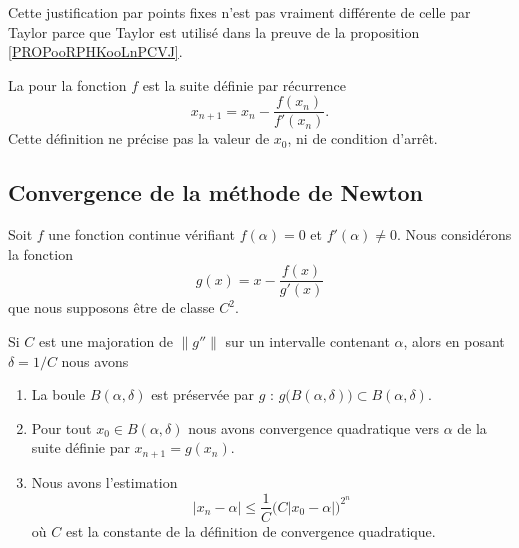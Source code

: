 \begin{remark}
    Cette justification par points fixes n'est pas vraiment différente de celle par Taylor parce que Taylor est utilisé dans la preuve de la proposition \ref{PROPooRPHKooLnPCVJ}.
\end{remark}

\begin{definition}
    La  pour la fonction \( f\) est la suite définie par récurrence
    \begin{equation}
        x_{n+1}=x_n-\frac{ f(x_n)  }{ f'(x_n) }.
    \end{equation}
    Cette définition ne précise pas la valeur de \( x_0\), ni de condition d'arrêt.
\end{definition}

\subsection{Convergence de la méthode de Newton}

\begin{theorem}       \label{THOooDOVSooWsAFkx}
    Soit \( f\) une fonction continue vérifiant \( f(\alpha)=0\) et \( f'(\alpha)\neq 0\). Nous considérons la fonction
    \begin{equation}
        g(x)=x-\frac{ f(x) }{ g'(x) }
    \end{equation}
    que nous supposons être de classe \( C^2\).

    Si \( C\) est une majoration de \( \| g'' \|\) sur un intervalle contenant \( \alpha\), alors en posant \( \delta=1/C\) nous avons 
    \begin{enumerate}
        \item       \label{ITEMooVXSKooWCVWQc}
            La boule \( B(\alpha,\delta)\) est préservée par \( g\) : \( g\big( B(\alpha,\delta) \big)\subset B(\alpha,\delta)\).
        \item       \label{ITEMooZPSXooGgbfhG}
            Pour tout \( x_0\in B(\alpha,\delta)\) nous avons convergence quadratique vers \( \alpha\) de la suite définie par \( x_{n+1}=g(x_n)\).
        \item       \label{ITEMooZCXZooCjeWPl}
            Nous avons l'estimation
            \begin{equation}        \label{EQooFAIPooDpoNWK}
                | x_n-\alpha |\leq \frac{1}{ C }\big( C| x_0-\alpha | \big)^{2^n}
            \end{equation}
            où \( C\) est la constante de la définition de convergence quadratique.
    \end{enumerate}
\end{theorem}

